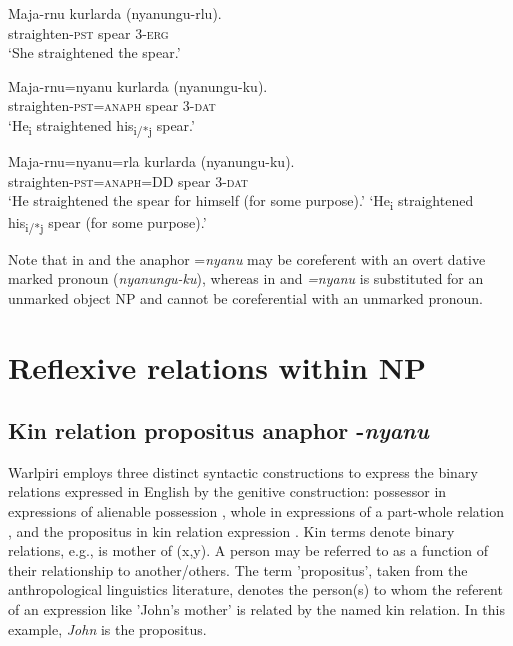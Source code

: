 \documentclass[output=paper]{../langscibook}
\begin{document}
\ea%
    \label{ex:laughren:29}

\ea
\label{ex:laughren:29a}
\gll Maja-rnu  kurlarda ({nyanungu-rlu}).\\
    straighten-\textsc{pst}  spear  3-\textsc{erg}\\
\glt `She straightened the spear.'\textsubscript{}


\ex
\label{ex:laughren:29b}
\gll Maja-rnu=nyanu  kurlarda ({nyanungu-ku}).\\
    straighten-\textsc{pst=anaph}  spear  3-\textsc{dat}\\
\glt `He\textsubscript{i} straightened his\textsubscript{i/*j} spear.'

\ex
\label{ex:laughren:29c}
\gll Maja-rnu=nyanu=rla  kurlarda ({nyanungu-ku}).\\
    straighten-\textsc{pst=anaph=DD}  spear  3-\textsc{dat}\\
\glt `He straightened the spear for himself (for some purpose).'
\glt `He\textsubscript{i} straightened his\textsubscript{i/*j} spear (for some purpose).'
\z
\z


Note that in  and  the anaphor =\textit{nyanu} may be coreferent with an overt dative marked pronoun (\textit{nyanungu-ku}), whereas in  and  \textit{=nyanu} is substituted for an unmarked object NP and cannot be coreferential with an unmarked pronoun.

\section{Reflexive relations within NP}\label{sec:laughren:4}

\subsection{Kin relation propositus anaphor -\textit{nyanu} }\label{sec:laughren:4.1}

Warlpiri employs three distinct syntactic constructions to express the binary relations expressed in English by the genitive construction: possessor in expressions of alienable possession , whole in expressions of a part-whole relation , and the propositus in kin relation expression . Kin terms denote binary relations, e.g., is mother of (x,y). A person may be referred to as a function of their relationship to another/others. The term 'propositus', taken from the anthropological linguistics literature, denotes the person(s) to whom the referent of an expression like 'John's mother' is related by the named kin relation. In this example, \textit{John} is the propositus.
\end{document}
